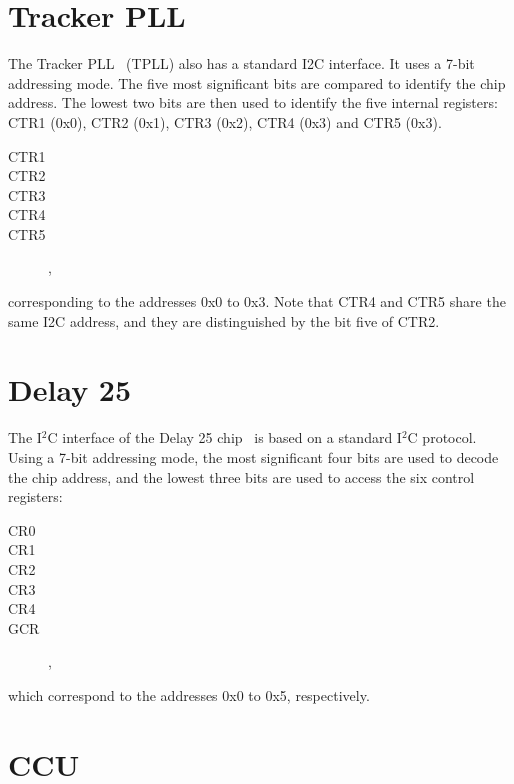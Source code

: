 \documentclass{cmspaper}
\begin{document}
\begin{appendix}
%
%



\section{Tracker PLL}

The Tracker PLL~\cite{TPLL} (TPLL) also has a standard I2C interface. It uses a 7-bit 
addressing mode. The five most significant bits are compared to 
identify the chip address. The lowest two bits are then used to 
identify the five internal registers: CTR1 (0x0), CTR2 (0x1), CTR3 (0x2), CTR4 
(0x3) and CTR5 (0x3). 
\begin{description}
\item[CTR1]
\item[CTR2]
\item[CTR3]
\item[CTR4]
\item[CTR5] ,
\end{description}
corresponding to the addresses 0x0 to 0x3. 
Note that CTR4 and CTR5 share the same I2C address, and 
they are distinguished by the bit five of CTR2.

\section{Delay 25 \label{app:del}}

The I$^2$C interface of the Delay 25 chip~\cite{DELAY25} is based on 
a standard I$^2$C protocol. Using a 7-bit addressing mode, the most significant four 
bits are used to decode the chip address, and the
lowest three bits are used to access the six control registers: 
\begin{description}
\item[CR0]
\item[CR1]
\item[CR2]
\item[CR3]
\item[CR4]
\item[GCR] ,
\end{description}
which correspond to the addresses 0x0 to 0x5, respectively. 


\section{CCU}


\end{appendix}
\end{document}
